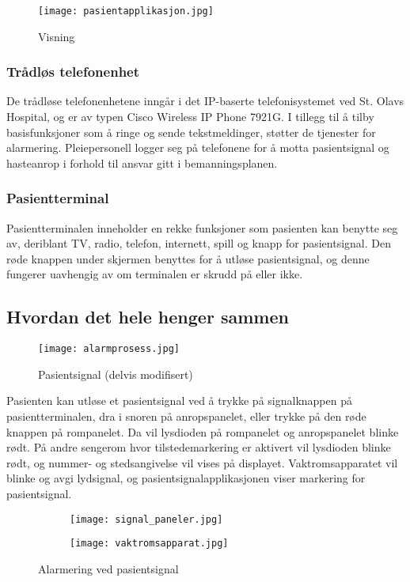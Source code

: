 \begin{figure}[H]
\centering
\texttt{[image: pasientapplikasjon.jpg]}
\caption{Visning}
\label{visning}
\end{figure}

\subsubsection{Trådløs telefonenhet}
De trådløse telefonenhetene inngår i det IP-baserte telefonisystemet ved St. Olavs Hospital, og er av typen Cisco Wireless IP Phone 7921G. I tillegg til å tilby basisfunksjoner som å ringe og sende tekstmeldinger, støtter de tjenester for alarmering. Pleiepersonell logger seg på telefonene for å motta pasientsignal og hasteanrop i forhold til ansvar gitt i bemanningsplanen.

\subsubsection{Pasientterminal}
Pasientterminalen inneholder en rekke funksjoner som pasienten kan benytte seg av, deriblant TV, radio, telefon, internett, spill og knapp for pasientsignal. Den røde knappen under skjermen benyttes for å utløse pasientsignal, og denne fungerer uavhengig av om terminalen er skrudd på eller ikke.

\pagebreak

\subsection{Hvordan det hele henger sammen}
\begin{figure}[H]
\centering
\texttt{[image: alarmprosess.jpg]}
\caption{Pasientsignal (delvis modifisert)}
\label{alarmprosess}
\end{figure}

\noindent
Pasienten kan utløse et pasientsignal ved å trykke på signalknappen på pasientterminalen, dra i snoren på anropspanelet, eller trykke på den røde knappen på rompanelet. Da vil lysdioden på rompanelet og anropspanelet blinke rødt. På andre sengerom hvor tilstedemarkering er aktivert vil lysdioden blinke rødt, og nummer- og stedsangivelse vil vises på displayet. Vaktromsapparatet vil blinke og avgi lydsignal, og pasientsignalapplikasjonen viser markering for pasientsignal.

\begin{figure}[H]
        \centering
        \begin{subfigure}[b]{0.35\textwidth}
        		\centering
                \texttt{[image: signal\_paneler.jpg]}
        \end{subfigure}
        \begin{subfigure}[b]{0.35\textwidth}
        		\centering
                \texttt{[image: vaktromsapparat.jpg]}
                \label{telefon}
        \end{subfigure}
        \caption{Alarmering ved pasientsignal}\label{pasientsignalalarm}
\end{figure}

